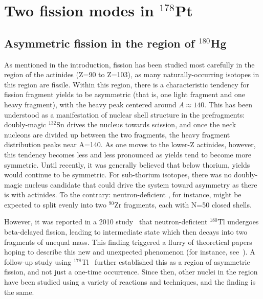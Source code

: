 \chapter{Two fission modes in $^{178}$Pt}\label{chap:178Pt}

\section{Asymmetric fission in the region of $^{180}$Hg}
As mentioned in the introduction, fission has been studied most carefully in the region of the actinides (Z=90 to Z=103), as many naturally-occurring isotopes in this region are fissile. Within this region, there is a characteristic tendency for fission fragment yields to be asymmetric (that is, one light fragment and one heavy fragment), with the heavy peak centered around $A\approx140$. This has been understood as a manifestation of nuclear shell structure in the prefragments: doubly-magic $^{132}$Sn drives the nucleus towards scission, and once the neck nucleons are divided up between the two fragments, the heavy fragment distribution peaks near A=140. As one moves to the lower-Z actinides, however, this tendency becomes less and less pronounced as yields tend to become more symmetric. Until recently, it was generally believed that below thorium, yields would continue to be symmetric. For sub-thorium isotopes, there was no doubly-magic nucleus candidate that could drive the system toward asymmetry as there is with actinides. To the contrary: neutron-deficient {\Hg}, for instance, might be expected to split evenly into two $^{90}$Zr fragments, each with N=50 closed shells.

However, it was reported in a 2010 study~\cite{Andreyev2010} that neutron-deficient $^{180}$Tl undergoes beta-delayed fission, leading to intermediate state {\Hg} which then decays into two fragments of unequal mass. This finding triggered a flurry of theoretical papers hoping to describe this new and unexpected phenomenon (for instance, see~\cite{Warda2012,Moller2012,Mcdonnell2014,Ichikawa2019}). A follow-up study using $^{178}$Tl~\cite{Liberati2013} further established this as a region of asymmetric fission, and not just a one-time occurrence. Since then, other nuclei in the region have been studied using a variety of reactions and techniques, and the finding is the same. 


